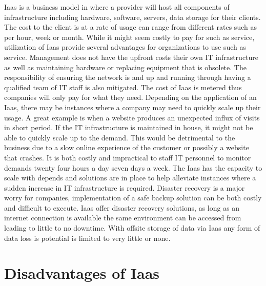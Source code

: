 \documentclass[9pt,twocolumn,twoside]{../../styles/osajnl}
\begin{document}
Iaas is a business model in where a provider will host all components
of infrastructure including hardware, software, servers, data storage
for their clients.  The cost to the client is at a rate of usage can
range from different rates such as per hour, week or month.  While it
might seem costly to pay for such as service, utilization of Iaas
provide several advantages for organizations to use such as service.
Management does not have the upfront costs their own IT infrastructure
as well as maintaining hardware or replacing equipment that is
obsolete.  The responsibility of ensuring the network is and up and
running through having a qualified team of IT staff is also mitigated.
The cost of Iaas is metered thus companies will only pay for what they
need. \cite{www-statetech} Depending on the application of an Iaas, there
may be instances where a company may need to quickly scale up their
usage.  A great example is when a website produces an unexpected
influx of visits in short period.  If the IT infrastructure is
maintained in house, it might not be able to quickly scale up to the
demand.  This would be detrimental to the business due to a slow
online experience of the customer or possibly a website that
crashes. \cite{www-linkedin} It is both costly and impractical to
staff IT personnel to monitor demands twenty four hours a day seven
days a week.  The Iaas has the capacity to scale with depends and
solutions are in place to help alleviate instances where a sudden
increase in IT infrastructure is required.  Disaster recovery is a
major worry for companies, implementation of a safe backup solution
can be both costly and difficult to execute.  Iaas offer disaster
recovery solutions, as long as an internet connection is available the
same environment can be accessed from leading to little to no
downtime.  With offsite storage of data via Iaas any form of data loss
is potential is limited to very little or none. \cite{www-statetech}

\section{Disadvantages of Iaas}
\end{document}
